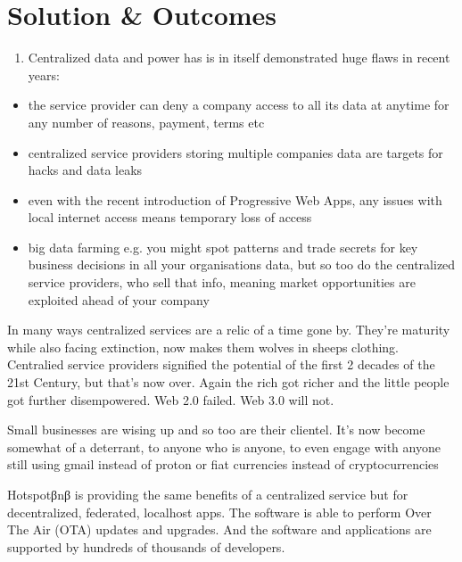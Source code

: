 \documentclass[letterpaper,10pt,openany,oneside,english]{sphinxmanual}
\begin{document}
\section{Solution \& Outcomes}
\label{\detokenize{executivesummary:solution-outcomes}}\begin{enumerate}
%
\item {} 
\sphinxAtStartPar
Centralized data and power has is in itself demonstrated huge flaws in recent years:

\end{enumerate}
\begin{itemize}
\item {} 
\sphinxAtStartPar
the service provider can deny a company access to all its data at anytime for any number of reasons, payment, terms etc

\item {} 
\sphinxAtStartPar
centralized service providers storing multiple companies data are targets for hacks and data leaks

\item {} 
\sphinxAtStartPar
even with the recent introduction of Progressive Web Apps, any issues with local internet access means temporary loss of access

\item {} 
\sphinxAtStartPar
big data farming e.g. you might spot patterns and trade secrets for key business decisions in all your organisations data,
but so too do the centralized service providers, who sell that info, meaning market opportunities are exploited ahead of your company

\end{itemize}

\sphinxAtStartPar
In many ways centralized services are a relic of a time gone by.
They’re maturity while also facing extinction, now makes them wolves in sheeps clothing.
Centralied service providers signified the potential of the first 2 decades of the 21st Century, but that’s now over.
Again the rich got richer and the little people got further disempowered. Web 2.0 failed. Web 3.0 will not.

\sphinxAtStartPar
Small businesses are wising up and so too are their clientel.
It’s now become somewhat of a deterrant, to anyone who is anyone, to even engage with anyone still using gmail instead of proton or fiat currencies instead of cryptocurrencies

\sphinxAtStartPar
Hotspotβnβ is providing the same benefits of a centralized service but for decentralized, federated, localhost apps.
The software is able to perform Over The Air (OTA) updates and upgrades.
And the software and applications are supported by hundreds of thousands of developers.
\end{document}
